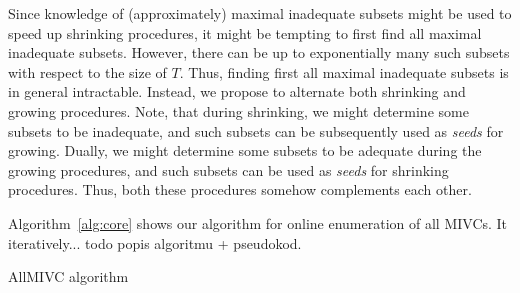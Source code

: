 Since knowledge of (approximately) maximal inadequate subsets might be used to speed up shrinking procedures, it might be tempting to first find all maximal inadequate subsets. However, there can be up to exponentially many such subsets with respect to the size of $T$. Thus, finding first all maximal inadequate subsets is in general intractable. Instead, we propose to alternate both shrinking and growing procedures. Note, that during shrinking, we might determine some subsets to be inadequate, and such subsets can be subsequently used as \emph{seeds} for growing. Dually, we might determine some subsets to be adequate during the growing procedures, and such subsets can be used as \emph{seeds} for shrinking procedures. Thus, both these procedures somehow complements each other. 

Algorithm~\ref{alg:core} shows our algorithm for online enumeration of all MIVCs. It iteratively... todo popis algoritmu + pseudokod. 


\begin{algorithm}[!t]

\caption{AllMIVC algorithm}
\end{algorithm}




 